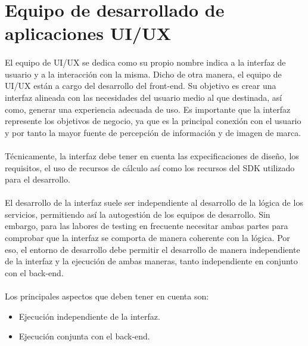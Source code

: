 \section{Equipo de desarrollado de aplicaciones UI/UX}\label{sec:uiteam}

\paragraph{}El equipo de \gls{UI/UX} se dedica como su propio nombre indica a la interfaz
de usuario y a la interacción con la misma. Dicho de otra manera, el equipo de \gls{UI/UX}
están a cargo del desarrollo del \gls{front-end}. Su objetivo es crear una interfaz
alineada con las necesidades del usuario medio al que destinada, así como, generar una
experiencia adecuada de uso. Es importante que la interfaz represente los objetivos de
negocio, ya que es la principal conexión con el usuario y por tanto la mayor fuente de
percepción de información y de imagen de marca.

\paragraph{}Técnicamente, la interfaz debe tener en cuenta las expecificaciones de diseño,
los requisitos, el uso de recursos de cálculo así como los recursos del \gls{SDK}
utilizado para el desarrollo.

\paragraph{}El desarrollo de la interfaz suele ser independiente al desarrollo de la
lógica de los servicios, permitiendo así la autogestión de los equipos de desarrollo.
Sin embargo, para las labores de testing en frecuente necesitar ambas partes para
comprobar que la interfaz se comporta de manera coherente con la lógica. Por eso, el
entorno de desarrollo debe permitir el desarrollo de manera independiente de la interfaz
y la ejecución de ambas maneras, tanto independiente en conjunto con el \gls{back-end}.

\paragraph{}Los principales aspectos que deben tener en cuenta son:

\begin{itemize}
    \item Ejecución independiente de la interfaz.
    \item Ejecución conjunta con el \gls{back-end}.
\end{itemize}

